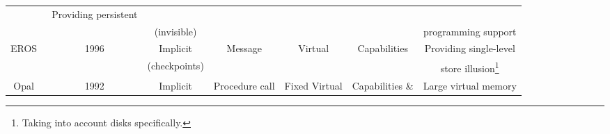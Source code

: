 {\begin{table}
\begin{minipage}{\textwidth}
\begin{tabular}{c c c c c c c}
                                                                        & Providing persistent                                                                                                                                                                                                                                                                                              \\
                                                                        &                                           & (invisible)                               &                        &                                                                               &                          & programming support                                                                   \\
                \midrule
                EROS~\cite{shapiro:usenix02}                            & 1996                                      & Implicit                                  & Message                & Virtual                                                                       & Capabilities             & Providing
                single-level                                                                                                                                                                                                                                                                                                                                                                \\
                                                                        &                                           & (checkpoints)                             &                        &                                                                               &                          & store illusion\footnote{Taking into account disks specifically.}                      \\
                \midrule
                Opal~\cite{chase:tocs94}                                & 1992                                      & Implicit                                  & Procedure call         & Fixed Virtual                                                                 & Capabilities \&          &
                Large virtual memory                                                                                                                                                                                                                                                                                                                                                        \\

\end{tabular}
\end{minipage}
\end{table}}
